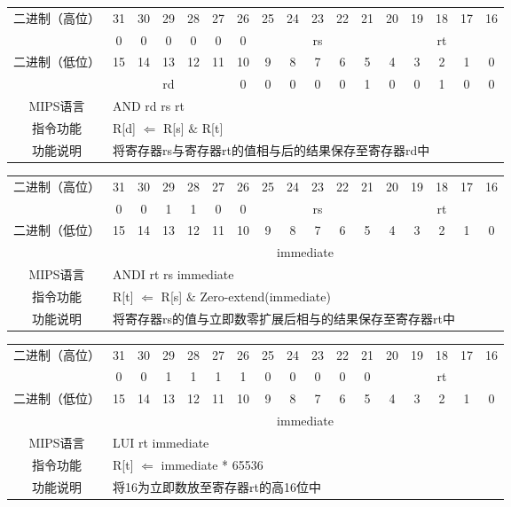 \begin{table}
\begin{tabular}{|c|c|c|c|c|c|c|c|c|c|c|c|c|c|c|c|c|}
\hline
\multirow{2}{*}{二进制（高位）} &
31&30&29&28&27&26&25&24&23&22&21&20&19&18&17&16\\
\cline{2-17}
&
0&0&0&0&0&
0&
\multicolumn{5}{c|}{rs}&
\multicolumn{5}{c|}{rt}\\
\hline
\multirow{2}{*}{二进制（低位）} &
15&14&13&12&11&10&9&8&7&6&5&4&3&2&1&0\\
\cline{2-17}
&
\multicolumn{5}{c|}{rd}&
0&0&0&0&0&
1&0&0&1&0&
0\\
\hline
MIPS语言&
\multicolumn{16}{l|}{AND rd rs rt}\\
\hline
指令功能&
\multicolumn{16}{l|}{R[d] $\Leftarrow$ R[s] $\&$ R[t]}\\
\hline
功能说明&
\multicolumn{16}{l|}{将寄存器rs与寄存器rt的值相与后的结果保存至寄存器rd中}\\
\hline
\end{tabular}
\end{table}

\clearpage

\begin{table}
\begin{tabular}{|c|c|c|c|c|c|c|c|c|c|c|c|c|c|c|c|c|}
\hline
\multirow{2}{*}{二进制（高位）} &
31&30&29&28&27&26&25&24&23&22&21&20&19&18&17&16\\
\cline{2-17}
&
0&0&1&1&0&
0&
\multicolumn{5}{c|}{rs}&
\multicolumn{5}{c|}{rt}\\
\hline
\multirow{2}{*}{二进制（低位）} &
15&14&13&12&11&10&9&8&7&6&5&4&3&2&1&0\\
\cline{2-17}
&
\multicolumn{16}{c|}{immediate}\\
\hline
MIPS语言&
\multicolumn{16}{l|}{ANDI rt rs immediate}\\
\hline
指令功能&
\multicolumn{16}{l|}{R[t] $\Leftarrow$ R[s] $\&$ Zero-extend(immediate)}\\
\hline
功能说明&
\multicolumn{16}{l|}{将寄存器rs的值与立即数零扩展后相与的结果保存至寄存器rt中}\\
\hline
\end{tabular}
\end{table}

\begin{table}
\begin{tabular}{|c|c|c|c|c|c|c|c|c|c|c|c|c|c|c|c|c|}
\hline
\multirow{2}{*}{二进制（高位）} &
31&30&29&28&27&26&25&24&23&22&21&20&19&18&17&16\\
\cline{2-17}
&
0&0&1&1&1&
1&0&0&0&0&
0&
\multicolumn{5}{c|}{rt}\\
\hline
\multirow{2}{*}{二进制（低位）} &
15&14&13&12&11&10&9&8&7&6&5&4&3&2&1&0\\
\cline{2-17}
&
\multicolumn{16}{c|}{immediate}\\
\hline
MIPS语言&
\multicolumn{16}{l|}{LUI rt immediate}\\
\hline
指令功能&
\multicolumn{16}{l|}{R[t] $\Leftarrow$ immediate * 65536}\\
\hline
功能说明&
\multicolumn{16}{l|}{将16为立即数放至寄存器rt的高16位中}\\
\hline
\end{tabular}
\end{table}

